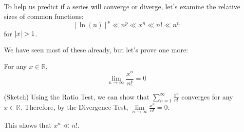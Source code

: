 To help us predict if a series will converge or diverge, let's examine the
relative sizes of common functions:
\[ \boxed{\left[ \ln(n) \right]^p\ll n^p\ll x^n\ll n!\ll n^n} \]
for $ \lvert x\rvert>1 $.

We have seen most of these already, but let's prove one more:
\begin{Theorem}{}{}
    For any $ x\in\mathbb{R} $,
    \[ \lim\limits_{{n} \to {\infty}} \frac{x^n}{n!} =0 \]
\end{Theorem}

\begin{Proof}{(Sketch)}{}
    Using the Ratio Test, we can show that $ \displaystyle\sum\limits_{n=1}^{\infty} \frac{x^n}{n!} $
    converges for any $ x\in\mathbb{R} $. Therefore, by the Divergence Test,
    $ \displaystyle \lim\limits_{{n} \to {\infty}} \frac{x^n}{n!} =0 $.
\end{Proof}
This shows that $ x^n\ll n! $.

